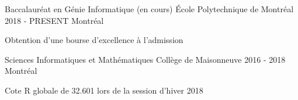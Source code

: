 \begin{cventries}
  \cventry
    {Baccalauréat en Génie Informatique (en cours)}
    {École Polytechnique de Montréal}
    {2018 - PRESENT}
    {Montréal}
    {
      \begin{cvitems}
        \item {Obtention d'une bourse d'excellence à l'admission}
      \end{cvitems}
    }
  \cventry
    {Sciences Informatiques et Mathématiques}
    {Collège de Maisonneuve}
    {2016 - 2018}
    {Montréal}
    {
        \begin{cvitems}
        \item {Cote R globale de 32.601 lors de la session d'hiver 2018}
        \end{cvitems}
    }
    
\end{cventries}
